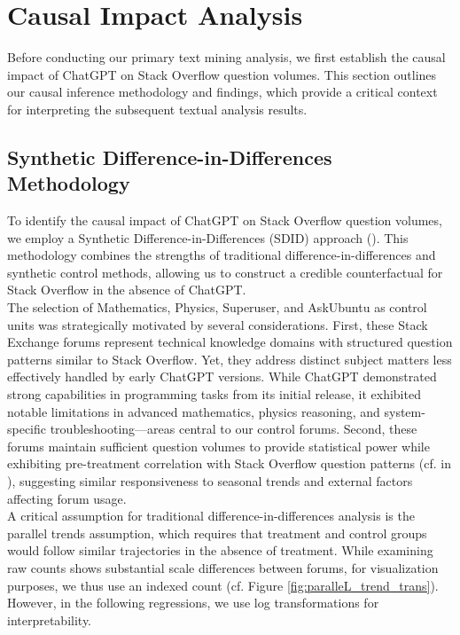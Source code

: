 \section{Causal Impact Analysis}
Before conducting our primary text mining analysis, we first establish the causal impact of ChatGPT on Stack Overflow question volumes. This section outlines our causal inference methodology and findings, which provide a critical context for interpreting the subsequent textual analysis results.


\subsection{Synthetic Difference-in-Differences Methodology}
To identify the causal impact of ChatGPT on Stack Overflow question volumes, we employ a Synthetic Difference-in-Differences (SDID) approach (\cite{arkhangelsky_synthetic_2021}). This methodology combines the strengths of traditional difference-in-differences and synthetic control methods, allowing us to construct a credible counterfactual for Stack Overflow in the absence of ChatGPT.\\

The selection of Mathematics, Physics, Superuser, and AskUbuntu as control units was strategically motivated by several considerations. First, these Stack Exchange forums represent technical knowledge domains with structured question patterns similar to Stack Overflow. Yet, they address distinct subject matters less effectively handled by early ChatGPT versions. While ChatGPT demonstrated strong capabilities in programming tasks from its initial release, it exhibited notable limitations in advanced mathematics, physics reasoning, and system-specific troubleshooting—areas central to our control forums. Second, these forums maintain sufficient question volumes to provide statistical power while exhibiting pre-treatment correlation with Stack Overflow question patterns (cf.  in ), suggesting similar responsiveness to seasonal trends and external factors affecting forum usage.\\

A critical assumption for traditional difference-in-differences analysis is the parallel trends assumption, which requires that treatment and control groups would follow similar trajectories in the absence of treatment. While examining raw counts shows substantial scale differences between forums, for visualization purposes, we thus use an indexed count (cf. Figure \ref{fig:paralleL_trend_trans}). However, in the following regressions, we use log transformations for interpretability.\\

